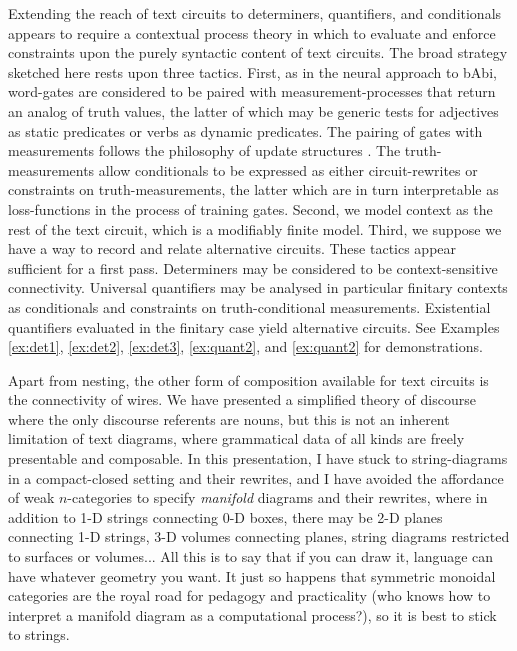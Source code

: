  Extending the reach of text circuits to determiners, quantifiers, and conditionals appears to require a contextual process theory in which to evaluate and enforce constraints upon the purely syntactic content of text circuits. The broad strategy sketched here rests upon three tactics. First, as in the neural approach to bAbi, word-gates are considered to be paired with measurement-processes that return an analog of truth values, the latter of which may be generic tests for adjectives as static predicates or verbs as dynamic predicates. The pairing of gates with measurements follows the philosophy of update structures \citep{heffordCategoriesSemanticConcepts2020b}. The truth-measurements allow conditionals to be expressed as either circuit-rewrites or constraints on truth-measurements, the latter which are in turn interpretable as loss-functions in the process of training gates. Second, we model context as the rest of the text circuit, which is a modifiably finite model. Third, we suppose we have a way to record and relate alternative circuits. These tactics appear sufficient for a first pass. Determiners may be considered to be context-sensitive connectivity. Universal quantifiers may be analysed in particular finitary contexts as conditionals and constraints on truth-conditional measurements. Existential quantifiers evaluated in the finitary case yield alternative circuits. See Examples \ref{ex:det1}, \ref{ex:det2}, \ref{ex:det3}, \ref{ex:quant2}, and \ref{ex:quant2} for demonstrations.

 Apart from nesting, the other form of composition available for text circuits is the connectivity of wires. We have presented a simplified theory of discourse where the only discourse referents are nouns, but this is not an inherent limitation of text diagrams, where grammatical data of all kinds are freely presentable and composable. In this presentation, I have stuck to string-diagrams in a compact-closed setting and their rewrites, and I have avoided the affordance of weak $n$-categories to specify \emph{manifold} diagrams and their rewrites, where in addition to 1-D strings connecting 0-D boxes, there may be 2-D planes connecting 1-D strings, 3-D volumes connecting planes, string diagrams restricted to surfaces or volumes... All this is to say that if you can draw it, language can have whatever geometry you want. It just so happens that symmetric monoidal categories are the royal road for pedagogy and practicality (who knows how to interpret a manifold diagram as a computational process?), so it is best to stick to strings.

